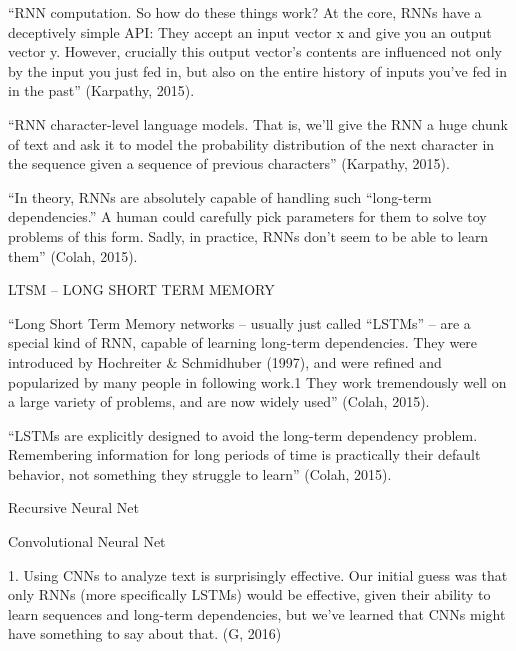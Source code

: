 \documentclass[12pt,english]{article}
\begin{document}
“RNN computation. So how do these things work? At the core, RNNs have a deceptively simple API: They accept an input vector x and give you an output vector y. However, crucially this output vector’s contents are influenced not only by the input you just fed in, but also on the entire history of inputs you’ve fed in in the past” (Karpathy, 2015).

“RNN character-level language models. That is, we’ll give the RNN a huge chunk of text and ask it to model the probability distribution of the next character in the sequence given a sequence of previous characters” (Karpathy, 2015).

“In theory, RNNs are absolutely capable of handling such “long-term dependencies.” A human could carefully pick parameters for them to solve toy problems of this form. Sadly, in practice, RNNs don’t seem to be able to learn them” (Colah, 2015).

LTSM – LONG SHORT TERM MEMORY

“Long Short Term Memory networks – usually just called “LSTMs” – are a special kind of RNN, capable of learning long-term dependencies. They were introduced by Hochreiter & Schmidhuber (1997), and were refined and popularized by many people in following work.1 They work tremendously well on a large variety of problems, and are now widely used” (Colah, 2015).

“LSTMs are explicitly designed to avoid the long-term dependency problem. Remembering information for long periods of time is practically their default behavior, not something they struggle to learn” (Colah, 2015).

Recursive Neural Net 

Convolutional Neural Net 

1. Using CNNs to analyze text is surprisingly effective. Our initial guess was that only RNNs (more specifically LSTMs) would be effective, given their ability to learn sequences and long-term dependencies, but we’ve learned that CNNs might have something to say about that. (G, 2016)
\end{document}

